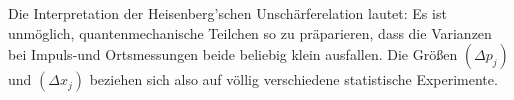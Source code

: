 Die Interpretation der Heisenberg'schen Unschärferelation lautet: Es ist unmöglich, quantenmechanische Teilchen so zu präparieren, dass die Varianzen bei Impuls-und Ortsmessungen beide beliebig klein ausfallen. Die Größen $(\Delta p_j)$ und $(\Delta x_j)$ beziehen sich also auf völlig verschiedene statistische Experimente.